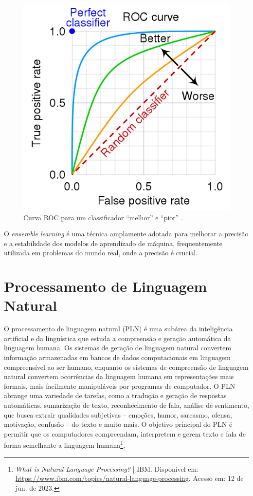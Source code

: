 \begin{figure}[!htbp]
	\centering
	\includegraphics[scale=0.36]{imagens/auroc.png}
    \caption {Curva ROC para um classificador ``melhor'' e ``pior'' \cite{RocCurveWiki}.}
\end{figure}

O \textit{ensemble learning} é uma técnica amplamente adotada para melhorar a precisão e a estabilidade dos modelos de aprendizado de máquina, frequentemente utilizada em problemas do mundo real, onde a precisão é crucial.

\section{Processamento de Linguagem Natural}

O processamento de linguagem natural (PLN) é uma subárea da inteligência artificial e da linguística que estuda a compreensão e geração automática da linguagem humana. Os sistemas de geração de linguagem natural convertem informação armazenadas em bancos de dados computacionais em linguagem compreensível ao ser humano, enquanto os sistemas de compreensão de linguagem natural convertem ocorrências da linguagem humana em representações mais formais, mais facilmente manipuláveis por programas de computador. O PLN abrange uma variedade de tarefas, como a tradução e geração de respostas automáticas, sumarização de texto, reconhecimento de fala, análise de sentimento, que busca extrair qualidades subjetivas – emoções, humor, sarcasmo, ofensa, motivação, confusão – do texto e muito mais. O objetivo principal do PLN é permitir que os computadores compreendam, interpretem e gerem texto e fala de forma semelhante a linguagem humana\footnote{\textit{What is Natural Language Processing?} | IBM. Disponível em: \url{https://www.ibm.com/topics/natural-language-processing}. Acesso em: 12 de jun. de 2023.}.

